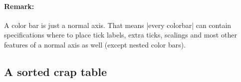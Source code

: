 \documentclass{article}
\begin{document}
{{		\paragraph{Remark:}
		A
		color
		bar
		is
		just
		a
		normal
		axis.
		That
		means
		|every
		colorbar|
		can
		contain
		specifications
		where
		to
		place
		tick
		labels,
		extra
		ticks,
		scalings
		and
		most
		other
		features
		of
		a
		normal
		axis
		as
		well
		(except
		nested
		color
		bars).
	}\loadedtable

	\ttfamily
	\pgfplotstablesort[sort cmp={string <}]\loadedtable\loadedtable
	

	\onecolumn

	\subsection{A sorted crap table}

	\pgfplotstabletypeset[column type=l,begin table=\begin{longtable},end table=\end{longtable},verb string type]\loadedtable

	\twocolumn
}
\end{document}
